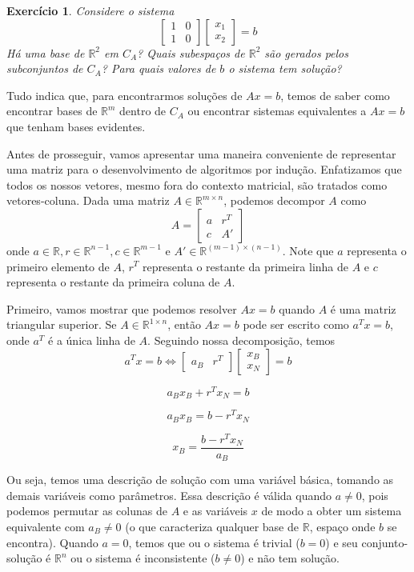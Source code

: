 \documentclass[]{article}
\newtheorem{exercicio}{Exercício}
\numberwithin{equation}{section}
\begin{document}
\begin{exercicio}
	Considere o sistema
	$$
	\begin{bmatrix}
	1 & 0 \\
	1 & 0
	\end{bmatrix}
	\begin{bmatrix}
	x_1 \\
	x_2
	\end{bmatrix}
	= b
	$$
	Há uma base de $\mathbb{R}^2$ em $C_A$? Quais subespaços de $\mathbb{R}^2$ são gerados pelos subconjuntos de $C_A$? Para quais valores de $b$ o sistema tem solução?
\end{exercicio}

Tudo indica que, para encontrarmos soluções de $Ax = b$, temos de saber como encontrar bases de $\mathbb{R}^m$ dentro de $C_A$ ou encontrar sistemas equivalentes a $Ax = b$ que tenham bases evidentes.

Antes de prosseguir, vamos apresentar uma maneira conveniente de representar uma matriz para o desenvolvimento de algoritmos por indução. Enfatizamos que todos os nossos vetores, mesmo fora do contexto matricial, são tratados como vetores-coluna. Dada uma matriz $A \in \mathbb{R}^{m \times n}$, podemos decompor $A$ como
$$
A =
\begin{bmatrix}
a & r^T \\
c & A'
\end{bmatrix}
$$
onde $a \in \mathbb{R}, r \in \mathbb{R}^{n - 1}, c \in \mathbb{R}^{m - 1}$ e $A' \in \mathbb{R}^{(m - 1) \times (n - 1)}$. Note que $a$ representa o primeiro elemento de $A$, $r^T$ representa o restante da primeira linha de $A$ e $c$ representa o restante da primeira coluna de $A$.

Primeiro, vamos mostrar que podemos resolver $Ax = b$ quando $A$ é uma matriz triangular superior. Se $A \in \mathbb{R}^{1 \times n}$, então $Ax = b$ pode ser escrito como $a^T x = b$, onde $a^T$ é a única linha de $A$. Seguindo nossa decomposição, temos
$$
a^T x = b \iff
\begin{bmatrix}
a_B & r^T
\end{bmatrix}
\begin{bmatrix}
x_B \\
x_N
\end{bmatrix}
= b
$$

$$
a_B x_B + r^T x_N = b
$$

$$
a_B x_B = b - r^T x_N
$$

$$
x_B = \frac{b - r^T x_N}{a_B}
$$

Ou seja, temos uma descrição de solução com uma variável básica, tomando as demais variáveis como parâmetros. Essa descrição é válida quando $a \neq 0$, pois podemos permutar as colunas de $A$ e as variáveis $x$ de modo a obter um sistema equivalente com $a_B \neq 0$ (o que caracteriza qualquer base de $\mathbb{R}$, espaço onde $b$ se encontra). Quando $a = 0$, temos que ou o sistema é trivial ($b = 0$) e seu conjunto-solução é $\mathbb{R}^n$ ou o sistema é inconsistente ($b \neq 0$) e não tem solução.
\end{document}
